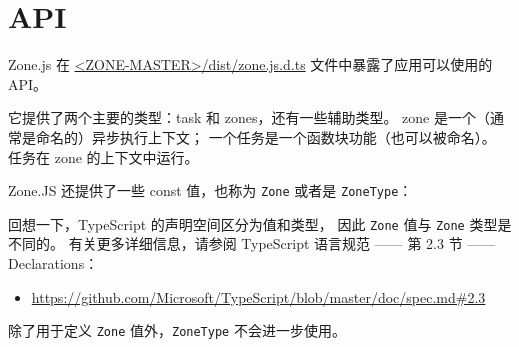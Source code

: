 \section{API}


Zone.js 在
\href{https://github.com/angular/zone.js/blob/master/dist/zone.js.d.ts}
{<ZONE-MASTER>/dist/zone.js.d.ts}
文件中暴露了应用可以使用的 API。


它提供了两个主要的类型：task 和 zones，还有一些辅助类型。
zone 是一个（通常是命名的）异步执行上下文；
一个任务是一个函数块功能（也可以被命名）。
任务在 zone 的上下文中运行。


Zone.JS 还提供了一些 const 值，也称为 \texttt{Zone} 或者是 \texttt{ZoneType}：




回想一下，TypeScript 的声明空间区分为值和类型，
因此 \texttt{Zone} 值与 \texttt{Zone} 类型是不同的。
有关更多详细信息，请参阅 TypeScript 语言规范 —— 第 2.3 节 —— Declarations：

\begin{itemize}
  \item \url{https://github.com/Microsoft/TypeScript/blob/master/doc/spec.md#2.3}
\end{itemize}



除了用于定义 \texttt{Zone} 值外，\texttt{ZoneType} 不会进一步使用。

